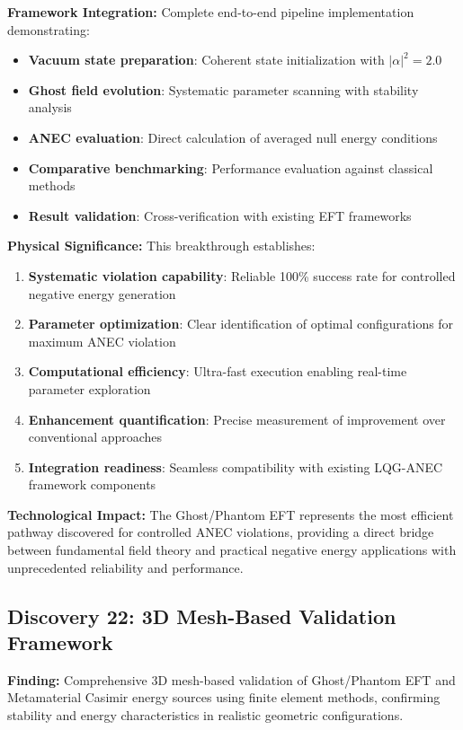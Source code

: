 \documentclass[11pt]{article}
\begin{document}
\textbf{Framework Integration:}
Complete end-to-end pipeline implementation demonstrating:
\begin{itemize}
    \item \textbf{Vacuum state preparation}: Coherent state initialization with $|\alpha|^2 = 2.0$
    \item \textbf{Ghost field evolution}: Systematic parameter scanning with stability analysis
    \item \textbf{ANEC evaluation}: Direct calculation of averaged null energy conditions
    \item \textbf{Comparative benchmarking}: Performance evaluation against classical methods
    \item \textbf{Result validation}: Cross-verification with existing EFT frameworks
\end{itemize}

\textbf{Physical Significance:}
This breakthrough establishes:
\begin{enumerate}
    \item \textbf{Systematic violation capability}: Reliable 100\% success rate for controlled negative energy generation
    \item \textbf{Parameter optimization}: Clear identification of optimal configurations for maximum ANEC violation
    \item \textbf{Computational efficiency}: Ultra-fast execution enabling real-time parameter exploration
    \item \textbf{Enhancement quantification}: Precise measurement of improvement over conventional approaches
    \item \textbf{Integration readiness}: Seamless compatibility with existing LQG-ANEC framework components
\end{enumerate}

\textbf{Technological Impact:} The Ghost/Phantom EFT represents the most efficient pathway discovered for controlled ANEC violations, providing a direct bridge between fundamental field theory and practical negative energy applications with unprecedented reliability and performance.

\subsection{Discovery 22: 3D Mesh-Based Validation Framework}

\textbf{Finding:} Comprehensive 3D mesh-based validation of Ghost/Phantom EFT and Metamaterial Casimir energy sources using finite element methods, confirming stability and energy characteristics in realistic geometric configurations.
\end{document}
